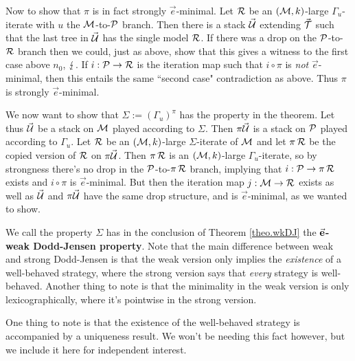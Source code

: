 {\qquad Now to show that $\pi$ is in fact strongly $\vec e$-minimal. Let $\R$ be an $(\M,k)$-large $\Gamma_u$-iterate with $u$ the $\M$-to-$\P$ branch. Then there is a stack $\vec\U$ extending $\vec\T$ such that the last tree in $\vec\U$ has the single model $\R$. If there was a drop on the $\P$-to-$\R$ branch then we could, just as above, show that this gives a witness to the first case above $n_0$, $\contr$. If $i:\P\to\R$ is the iteration map such that $i\circ\pi$ is \textit{not} $\vec e$-minimal, then this entails the same ``second case" contradiction as above. Thus $\pi$ is strongly $\vec e$-minimal.

\qquad We now want to show that $\Sigma:=(\Gamma_u)^\pi$ has the property in the theorem. Let thus $\vec\U$ be a stack on $\M$ played according to $\Sigma$. Then $\pi\vec\U$ is a stack on $\P$ played according to $\Gamma_u$. Let $\R$ be an $(\M,k)$-large $\Sigma$-iterate of $\M$ and let $\pi\R$ be the copied version of $\R$ on $\pi\vec\U$. Then $\pi\R$ is an $(\M,k)$-large $\Gamma_u$-iterate, so by strongness there's no drop in the $\P$-to-$\pi\R$ branch, implying that $i:\P\to\pi\R$ exists and $i\circ\pi$ is $\vec e$-minimal. But then the iteration map $j:\M\to\R$ exists as well as $\vec\U$ and $\pi\vec\U$ have the same drop structure, and is $\vec e$-minimal, as we wanted to show.
}

We call the property $\Sigma$ has in the conclusion of Theorem \ref{theo.wkDJ} the \textbf{$\vec{\b e}$-weak Dodd-Jensen property}. Note that the main difference between weak and strong Dodd-Jensen is that the weak version only implies the \textit{existence} of a well-behaved strategy, where the strong version says that \textit{every} strategy is well-behaved. Another thing to note is that the minimality in the weak version is only lexicographically, where it's pointwise in the strong version.

\qquad One thing to note is that the existence of the well-behaved strategy is accompanied by a uniqueness result. We won't be needing this fact however, but we include it here for independent interest.


